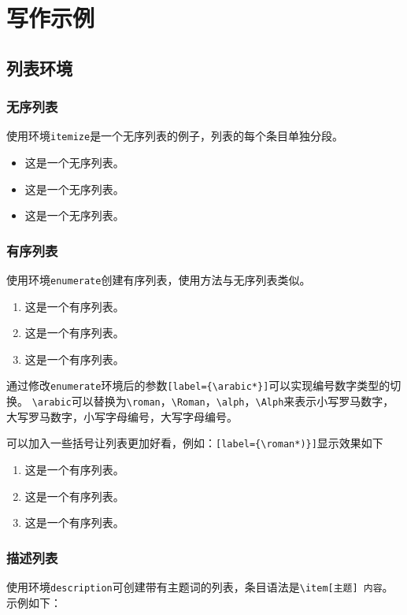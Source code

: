 \chapter{写作示例}

\section{列表环境}

\subsection{无序列表}

使用环境\verb+itemize+是一个无序列表的例子，列表的每个条目单独分段。

\begin{itemize}
	\item 这是一个无序列表。
	\item 这是一个无序列表。
	\item 这是一个无序列表。
\end{itemize}

\subsection{有序列表}

使用环境\verb+enumerate+创建有序列表，使用方法与无序列表类似。

\begin{enumerate}[label={\arabic*}]
	\item 这是一个有序列表。
	\item 这是一个有序列表。
	\item 这是一个有序列表。
\end{enumerate}

通过修改\verb+enumerate+环境后的参数\verb+[label={\arabic*}]+可以实现编号数字类型的切换。
\verb+\arabic+可以替换为\verb+\roman+，\verb+\Roman+，\verb+\alph+，\verb+\Alph+来表示小写罗马数字，大写罗马数字，小写字母编号，大写字母编号。

可以加入一些括号让列表更加好看，例如：\verb+[label={\roman*)}]+显示效果如下

\begin{enumerate}[label={\roman*)}]
	\item 这是一个有序列表。
	\item 这是一个有序列表。
	\item 这是一个有序列表。
\end{enumerate}
\subsection{描述列表}
使用环境\verb+description+可创建带有主题词的列表，条目语法是\verb+\item[主题] 内容+。示例如下：

